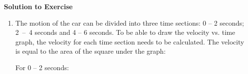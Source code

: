 {\begin{mdframed}[linewidth=4, leftmargin=40, rightmargin=40]
\begin{exercise}
\begin{figure}[H]
 \end{figure}   

    \addtocounter{footnote}{-0}
    
      \par 
      
      \vspace{5pt}
      \label{m38795*solfhsst!!!underscore!!!id3768}\noindent\textbf{Solution to Exercise } \label{m38795*listfhsst!!!underscore!!!id3768}\begin{enumerate}[noitemsep, label=\textbf{Step} \textbf{\arabic*}. ] 
            \leftskip=20pt\rightskip=\leftskip\item  
      \label{m38795*id74944}The motion of the car can be divided into three time sections: 0 -- 2 seconds; 2~--~4 seconds and 4 -- 6 seconds. To be able to draw the velocity vs. time graph, the velocity for each time section needs to be calculated. The velocity is equal to the area of the square under the graph:\par 
      \label{m38795*id74953}For 0 -- 2 seconds:
\label{m38795*id74963}\nopagebreak\noindent{}
\end{enumerate}
\end{exercise}
\end{mdframed}}
